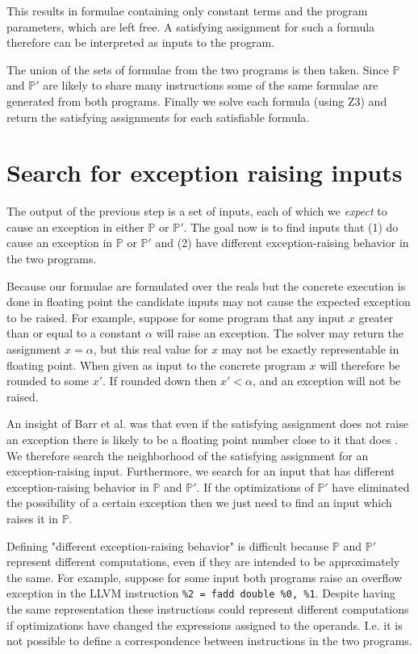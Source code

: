 \documentclass{article}
\begin{document}
This results in formulae containing only constant terms and the program
parameters, which are left free. A satisfying assignment for such a formula
therefore can be interpreted as inputs to the program.

The union of the sets of formulae from the two programs is then taken. Since
$\mathbb{P}$ and $\mathbb{P'}$ are likely to share many instructions some of the
same formulae are generated from both programs. Finally we solve each formula
(using Z3) and return the satisfying assignments for each satisfiable formula.

\section{Search for exception raising inputs}

The output of the previous step is a set of inputs, each of which we
\textit{expect} to cause an exception in either $\mathbb{P}$ or $\mathbb{P'}$.
The goal now is to find inputs that (1) do cause an exception in $\mathbb{P}$ or
$\mathbb{P'}$ and (2) have different exception-raising behavior in the two
programs.

Because our formulae are formulated over the reals but the concrete execution is
done in floating point the candidate inputs may not cause the expected exception
to be raised. For example, suppose for some program that any input $x$ greater
than or equal to a constant $\alpha$ will raise an exception. The solver may
return the assignment $x = \alpha$, but this real value for $x$ may not be
exactly representable in floating point. When given as input to the concrete
program $x$ will therefore be rounded to some $x'$. If rounded down then $x' <
\alpha$, and an exception will not be raised.

An insight of Barr et al. was that even if the satisfying assignment does not
raise an exception there is likely to be a floating point number close to it
that does \cite[2]{barr_automatic_2013}. We therefore search the neighborhood of
the satisfying assignment for an exception-raising input. Furthermore, we search
for an input that has different exception-raising behavior in $\mathbb{P}$ and
$\mathbb{P'}$. If the optimizations of $\mathbb{P'}$ have eliminated the
possibility of a certain exception then we just need to find an input which
raises it in $\mathbb{P}$.

Defining "different exception-raising behavior" is difficult because
$\mathbb{P}$ and $\mathbb{P'}$ represent different computations, even if they
are intended to be approximately the same. For example, suppose for some input
both programs raise an overflow exception in the LLVM instruction \texttt{\%2 =
fadd double \%0, \%1}. Despite having the same representation these instructions
could represent different computations if optimizations have changed the
expressions assigned to the operands. I.e. it is not possible to define a
correspondence between instructions in the two programs.
\end{document}
